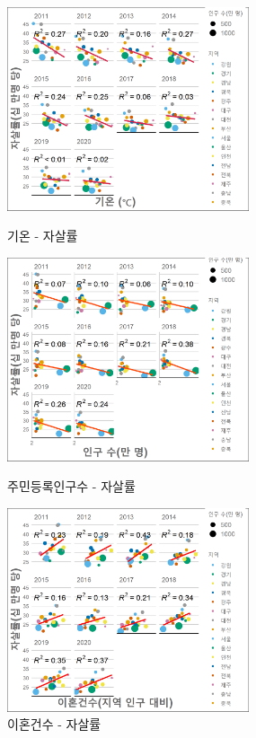 \documentclass[a4paper, 11pt]{oblivoir}
\begin{document}
    \begin{figure}[!ht]
        \includegraphics[height = 6cm, width = \linewidth]{c1.png}
        \caption{기온 - 자살률}
        \label{fig:pic111}
        \endminipage\hfill
        \includegraphics[height = 6cm, width = \linewidth]{c4.png}
        \caption{주민등록인구수 - 자살률}
        \label{fig:pic121}
        \endminipage\hfill
        \includegraphics[height = 6cm, width = \linewidth]{c3.png}
        \caption{이혼건수 - 자살률}
        \label{fig:pic131}
        \endminipage\hfill
    
    \end{figure}
\end{document}
